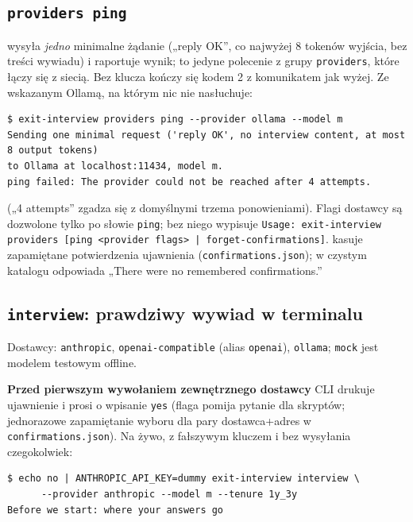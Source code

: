 {\subsection{\texttt{providers ping}}

 wysyła \emph{jedno}
minimalne żądanie („reply OK”, co najwyżej 8 tokenów wyjścia, bez treści
wywiadu) i raportuje wynik; to jedyne polecenie z grupy \texttt{providers},
które łączy się z siecią. Bez klucza kończy się kodem 2 z komunikatem jak wyżej.
Ze wskazanym Ollamą, na którym nic nie nasłuchuje:

\begin{Verbatim}[fontsize=\scriptsize,frame=single,framesep=2mm]
$ exit-interview providers ping --provider ollama --model m
Sending one minimal request ('reply OK', no interview content, at most 8 output tokens)
to Ollama at localhost:11434, model m.
ping failed: The provider could not be reached after 4 attempts.
\end{Verbatim}

(„4 attempts” zgadza się z domyślnymi trzema ponowieniami). Flagi dostawcy są
dozwolone tylko po słowie \texttt{ping}; bez niego  wypisuje
\texttt{Usage: exit-interview providers [ping <provider flags> | forget-confirmations]}.
 kasuje zapamiętane potwierdzenia
ujawnienia (\texttt{confirmations.\allowbreak{}json}); w czystym katalogu odpowiada „There
were no remembered confirmations.”

\subsection{\texttt{interview}: prawdziwy wywiad w terminalu}

Dostawcy: \texttt{anthropic}, \texttt{openai-\allowbreak{}compatible} (alias \texttt{openai}),
\texttt{ollama}; \texttt{mock} jest modelem testowym offline.

\textbf{Przed pierwszym wywołaniem zewnętrznego dostawcy} CLI drukuje
ujawnienie i prosi o wpisanie \texttt{yes} (flaga 
pomija pytanie dla skryptów; jednorazowe zapamiętanie wyboru dla pary
dostawca+adres w \texttt{confirmations.\allowbreak{}json}). Na żywo, z fałszywym kluczem i bez
wysyłania czegokolwiek:

\begin{Verbatim}[fontsize=\scriptsize,frame=single,framesep=2mm]
$ echo no | ANTHROPIC_API_KEY=dummy exit-interview interview \
      --provider anthropic --model m --tenure 1y_3y
Before we start: where your answers go


\end{Verbatim}}

